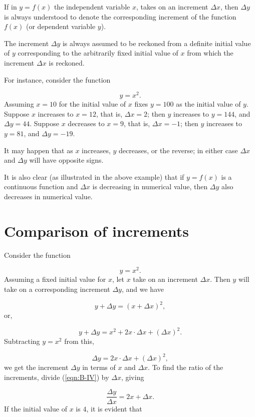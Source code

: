If in $y = f(x)$ the independent variable $x$, takes on an increment 
$\Delta x$, then $\Delta y$ is always understood to denote the 
corresponding increment of the function $f(x)$ (or dependent variable $y$).

The increment $\Delta y$ is always assumed to be reckoned 
from a definite initial value of $y$ corresponding to the arbitrarily 
fixed initial value of $x$ from which the increment $\Delta x$ 
is reckoned. 

\begin{example}
{\rm
For instance, consider the function

\[
    y = x^2. 
\]
Assuming $x = 10$ for the initial value of $x$ fixes $y = 100$ as 
the initial value of $y$.
Suppose $x$ increases to $x = 12$, that is, $\Delta x 	= 2$;
then $y$ increases to $y = 144$, and $\Delta y 	= 44$.
Suppose $x$ decreases to $x = 9$, that is, $\Delta x = - 1$;
then $y$ increases to $y= 81$,	and $\Delta y 	= - 19$.
}
\end{example}

It may happen that as $x$ increases, $y$ decreases, or the reverse; 
in either case $\Delta x$ and $\Delta y$ will have opposite signs.

It is also clear (as illustrated in the above example) that if 
$y = f(x)$ is a continuous function and $\Delta x$ is decreasing in 
numerical value, then $\Delta y$ also decreases in numerical value.


\section{Comparison of increments}
Consider the function

\[
 y = x^2.
\]
Assuming a fixed initial value for $x$, let $x$ take on an 
increment $\Delta x$. Then $y$ will take on a corresponding 
increment $\Delta y$, and we have

\[
 	y + \Delta y 	= (x + \Delta x)^2,
\]
or, 

\[
	y + \Delta y 	= x^2+ 2x \cdot \Delta x + (\Delta x)^2.
\]
Subtracting $y 	= x^2$ 
from this, %

\begin{equation}
\Delta y = 2x \cdot \Delta x + (\Delta x)^2,
\label{eqn:B-IV}
\end{equation}
we get the increment $\Delta y$ in terms of $x$ and $\Delta x$.
To find the ratio of the increments, divide 
(\ref{eqn:B-IV})  %
by $\Delta x$, giving

\[
    \frac{\Delta y}{\Delta x} = 2x + \Delta x.
\]
If the initial value of $x$ is $4$, it is evident that

